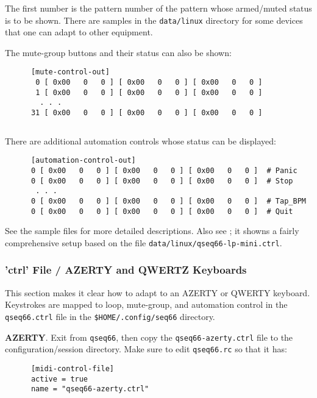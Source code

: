    The first number is the pattern number of the pattern whose armed/muted
   status is to be shown.
   There are samples in the \texttt{data/linux} directory for some devices that
   one can adapt to other equipment.

   The mute-group buttons and their status can also be shown:

   \begin{verbatim}
      [mute-control-out]
       0 [ 0x00   0   0 ] [ 0x00   0   0 ] [ 0x00   0   0 ]
       1 [ 0x00   0   0 ] [ 0x00   0   0 ] [ 0x00   0   0 ]
        . . .
      31 [ 0x00   0   0 ] [ 0x00   0   0 ] [ 0x00   0   0 ]
   \end{verbatim}

   \begin{verbatim}
   \end{verbatim}

   There are additional automation controls whose status can be displayed:

   \begin{verbatim}
      [automation-control-out]
      0 [ 0x00   0   0 ] [ 0x00   0   0 ] [ 0x00   0   0 ]  # Panic
      0 [ 0x00   0   0 ] [ 0x00   0   0 ] [ 0x00   0   0 ]  # Stop
       . . .
      0 [ 0x00   0   0 ] [ 0x00   0   0 ] [ 0x00   0   0 ]  # Tap_BPM
      0 [ 0x00   0   0 ] [ 0x00   0   0 ] [ 0x00   0   0 ]  # Quit
   \end{verbatim}

   See the sample files for more detailed descriptions.
   Also see ; it showns a fairly comprehensive
   setup based on the file \texttt{data/linux/qseq66-lp-mini.ctrl}.

\subsubsection{'ctrl' File / AZERTY and QWERTZ Keyboards}
\label{subsubsec:configuration_ctrl_azerty}

   This section makes it clear how to adapt to an AZERTY or QWERTY keyboard.
   Keystrokes are mapped to loop, mute-group, and automation control in the
   \texttt{qseq66.ctrl} file in the \texttt{\$HOME/.config/seq66} directory.

   \textbf{AZERTY}.
   Exit from \texttt{qseq66}, then copy the \texttt{qseq66-azerty.ctrl}
   file to the configuration/session directory.
   Make sure to edit \texttt{qseq66.rc} so that it has:

   \begin{verbatim}
      [midi-control-file]
      active = true
      name = "qseq66-azerty.ctrl"
   \end{verbatim}

